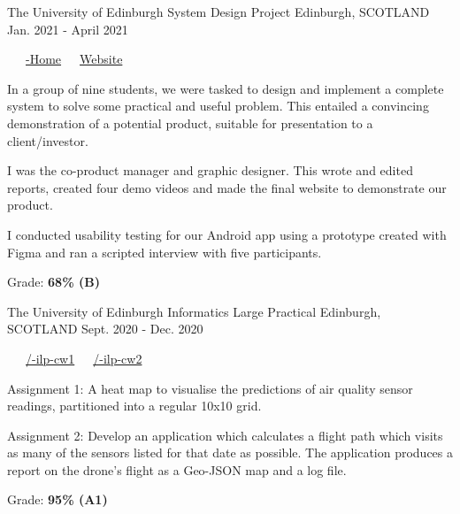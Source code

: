 \begin{cventries}
  \cventry
    {The University of Edinburgh} %
    {System Design Project} %
    {Edinburgh, SCOTLAND} %
    {Jan. 2021 - April 2021} %
    {
      \color{awesome}     \color{graytext}\ \ \ \href{https://github.com/DeliverED-Home}{\faGithub\acvHeaderIconSep\@DeliverED-Home}\ \ \ \href{https://DeliverED-Home.github.io/DeliverED-Site}{\faGlobe\acvHeaderIconSep\@Product Website}
      \vspace{1.8em}
      \begin{cvitems} %
        \item In a group of nine students, we were tasked to design and implement a complete system to solve some practical and useful problem. This entailed a convincing demonstration of a potential product, suitable for presentation to a client/investor.
        \item I was the co-product manager and graphic designer. This wrote and edited reports, created four demo videos and made the final website to demonstrate our product.
        \item I conducted usability testing for our Android app using a prototype created with Figma and ran a scripted interview with five participants.
        \item Grade: \textbf{68\% (B)}
      \end{cvitems}
    }
    \vspace{.08cm}

  \cventry
    {The University of Edinburgh} %
    {Informatics Large Practical} %
    {Edinburgh, SCOTLAND} %
    {Sept. 2020 - Dec. 2020} %
    {
      \color{awesome} \color{graytext}\ \ \ \href{https://github.com/chrisjpm/inf3-ilp-cw1}{\faGithub\acvHeaderIconSep\@chrisjpm/-ilp-cw1}\ \ \ \href{https://github.com/chrisjpm/inf3-ilp-cw2}{\faGithub\acvHeaderIconSep\@chrisjpm/-ilp-cw2}
      \vspace{1.8em}
      \begin{cvitems} %
        \item Assignment 1: A heat map to visualise the predictions of air quality sensor readings, partitioned into a regular 10x10 grid.
        \item Assignment 2: Develop an application which calculates a flight path which visits as many of the sensors listed for that date as possible. The application produces a report on the drone’s flight as a Geo-JSON map and a log file.
        \item Grade: \textbf{95\% (A1)}
      \end{cvitems}
    }
    \vspace{.08cm}
\end{cventries}
